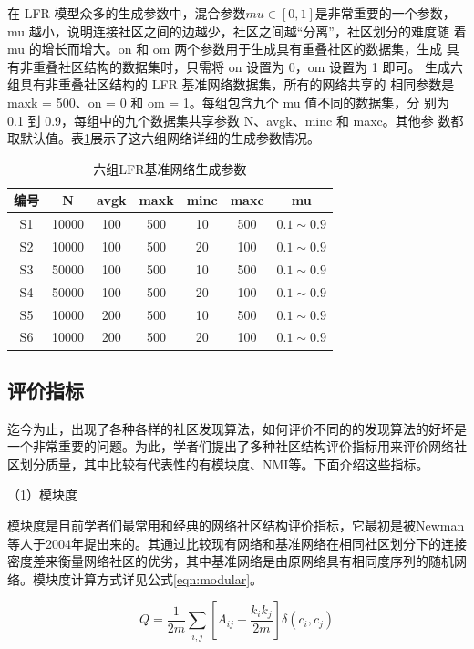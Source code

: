 在 LFR 模型众多的生成参数中，混合参数$ mu \in [0,1]$是非常重要的一个参数，
mu 越小，说明连接社区之间的边越少，社区之间越“分离”，社区划分的难度随
着 mu 的增长而增大。on 和 om 两个参数用于生成具有重叠社区的数据集，生成
具有非重叠社区结构的数据集时，只需将 on 设置为 0，om 设置为 1 即可。 
生成六组具有非重叠社区结构的 LFR 基准网络数据集，所有的网络共享的
相同参数是 maxk = 500、on = 0 和 om = 1。每组包含九个 mu 值不同的数据集，分
别为 0.1 到 0.9，每组中的九个数据集共享参数 N、avgk、minc 和 maxc。其他参
数都取默认值。表\ref{tab:tab3-5}展示了这六组网络详细的生成参数情况。 

\begin{table}
  \centering
  \caption{六组LFR基准网络生成参数} \label{tab:tab3-5}
  \begin{tabular*}{0.9\textwidth}{@{\extracolsep{\fill}}ccccccc}
  \toprule
    编号		&N  &avgk &maxk &minc &maxc &mu\\
  \midrule
    S1  &10000  &100 &500 &10 &500 &$0.1\sim 0.9$\\
    S2  &10000  &100 &500 &20 &100 &$0.1\sim 0.9$\\
    S3  &50000  &100 &500 &10 &500 &$0.1\sim 0.9$\\
    S4  &50000  &100 &500 &20 &100 &$0.1\sim 0.9$\\
    S5  &10000  &200 &500 &10 &500 &$0.1\sim 0.9$\\
    S6  &10000  &200 &500 &20 &100 &$0.1\sim 0.9$\\
  \bottomrule
  \end{tabular*}
\end{table}

\subsection{评价指标}
迄今为止，出现了各种各样的社区发现算法，如何评价不同的的发现算法的好坏是一个非常重要的问题。为此，学者们提出了多种社区结构评价指标用来评价网络社区划分质量，其中比较有代表性的有模块度、NMI等。下面介绍这些指标。

（1）模块度

模块度是目前学者们最常用和经典的网络社区结构评价指标，它最初是被Newman等人于2004年提出来的\cite{2002Community}。其通过比较现有网络和基准网络在相同社区划分下的连接密度差来衡量网络社区的优劣，其中基准网络是由原网络具有相同度序列的随机网络。模块度计算方式详见公式\ref{eqn:modular}。

\begin{equation}
  \label{eqn:modular}
  Q=\frac{1}{2m}\sum_{i,j}\left [ A_{ij}-\frac{k_ik_j}{2m} \right ]\delta (c_i, c_j)  
\end{equation}

